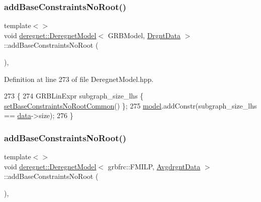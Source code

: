 \subsubsection{\texorpdfstring{add\+Base\+Constraints\+No\+Root()}{addBaseConstraintsNoRoot()}\hspace{0.1cm}{\footnotesize\ttfamily [2/3]}}
{\footnotesize\ttfamily template$<$$>$ \\
void \hyperlink{classderegnet_1_1DeregnetModel}{deregnet\+::\+Deregnet\+Model}$<$ G\+R\+B\+Model, \hyperlink{classderegnet_1_1DrgntData}{Drgnt\+Data} $>$\+::add\+Base\+Constraints\+No\+Root (\begin{DoxyParamCaption}{ }\end{DoxyParamCaption})\hspace{0.3cm}{\ttfamily [inline]}, {\ttfamily [private]}}



Definition at line 273 of file Deregnet\+Model.\+hpp.


\begin{DoxyCode}
273                                                                   \{
274     GRBLinExpr subgraph\_size\_lhs \{ \hyperlink{classderegnet_1_1DeregnetModel_a5f6cc627b7a800f3d9d77f5f859d241c}{setBaseConstraintsNoRootCommon}() \};
275     \hyperlink{classderegnet_1_1DeregnetModel_a30d525de2086e342b33fe3e45ede4947}{model}.addConstr(subgraph\_size\_lhs == \hyperlink{classderegnet_1_1DeregnetModel_ad5399761cf6293a702f3800bda4806d1}{data}->size);
276 \}
\end{DoxyCode}
\mbox{\label{classderegnet_1_1DeregnetModel_a54f3e682bcd27dab4046ac879f69ff91}} 
\subsubsection{\texorpdfstring{add\+Base\+Constraints\+No\+Root()}{addBaseConstraintsNoRoot()}\hspace{0.1cm}{\footnotesize\ttfamily [3/3]}}
{\footnotesize\ttfamily template$<$$>$ \\
void \hyperlink{classderegnet_1_1DeregnetModel}{deregnet\+::\+Deregnet\+Model}$<$ grbfrc\+::\+F\+M\+I\+LP, \hyperlink{classderegnet_1_1AvgdrgntData}{Avgdrgnt\+Data} $>$\+::add\+Base\+Constraints\+No\+Root (\begin{DoxyParamCaption}{ }\end{DoxyParamCaption})\hspace{0.3cm}{\ttfamily [inline]}, {\ttfamily [private]}}



